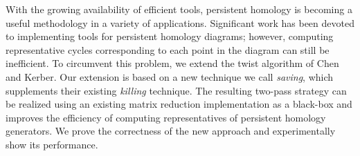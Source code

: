 With the growing availability of efficient tools, persistent homology is becoming a useful methodology in a variety of applications. Significant work has been devoted to implementing tools for persistent homology diagrams; however, computing representative cycles corresponding to each point in the diagram can still be inefficient. To circumvent this problem, we extend the twist algorithm of Chen and Kerber. Our extension is based on a new technique we call \emph{saving}, which supplements their existing \emph{killing} technique. The resulting two-pass strategy can be realized using an existing matrix reduction implementation as a black-box and improves the efficiency of computing representatives of persistent homology generators. We prove the correctness of the new approach and experimentally show its performance.